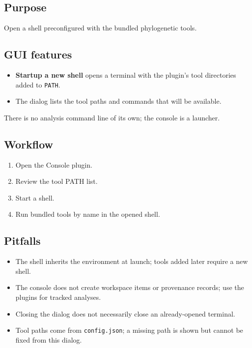 \documentclass[11pt]{report}
\begin{document}
\subsection{Purpose}

Open a shell preconfigured with the bundled phylogenetic tools.

\subsection{GUI features}

\begin{itemize}
  \item \textbf{Startup a new shell} opens a terminal with the plugin's tool directories added to \texttt{PATH}.
  \item The dialog lists the tool paths and commands that will be available.
\end{itemize}

There is no analysis command line of its own; the console is a launcher.

\subsection{Workflow}

\begin{enumerate}
  \item Open the Console plugin.
  \item Review the tool PATH list.
  \item Start a shell.
  \item Run bundled tools by name in the opened shell.
\end{enumerate}

\subsection{Pitfalls}

\begin{itemize}
  \item The shell inherits the environment at launch; tools added later require a new shell.
  \item The console does not create workspace items or provenance records; use the plugins for tracked analyses.
  \item Closing the dialog does not necessarily close an already-opened terminal.
  \item Tool paths come from \texttt{config.\allowbreak json}; a missing path is shown but cannot be fixed from this dialog.
\end{itemize}
\end{document}
